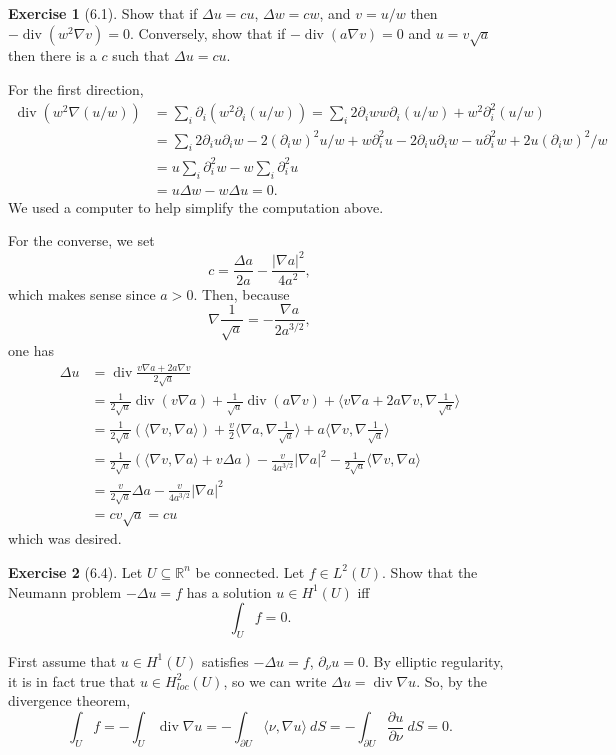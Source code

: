 \documentclass[10pt]{article}
\newcommand{\RR}{\mathbb{R}}
\DeclareMathOperator{\Div}{div}
\theoremstyle{definition}
\newtheorem{exer}{Exercise}
\begin{document}
\begin{exer}[6.1]
Show that if $\Delta u = cu$, $\Delta w = cw$, and $v = u/w$ then $-\Div(w^2\nabla v) = 0$. Conversely, show that if $-\Div(a\nabla v) = 0$ and $u = v\sqrt a$ then there is a $c$ such that $\Delta u = cu$.
\end{exer}

For the first direction,
\begin{align*}
\Div(w^2 \nabla(u/w)) &= \sum_i \partial_i(w^2 \partial_i(u/w)) = \sum_i 2\partial_iw w\partial_i(u/w) + w^2 \partial_i^2(u/w)\\
&= \sum_i 2\partial_i u\partial_i w - 2(\partial_iw)^2u/w + w\partial_i^2u - 2\partial_iu\partial_iw - u\partial_i^2w + 2u(\partial_iw)^2/w\\
&= u\sum_i \partial_i^2w - w\sum_i \partial_i^2u\\
&= u\Delta w - w\Delta u = 0.\end{align*}
We used a computer to help simplify the computation above.

For the converse, we set
$$c = \frac{\Delta a}{2a} - \frac{|\nabla a|^2}{4a^2},$$
which makes sense since $a > 0$. Then, because
$$\nabla \frac{1}{\sqrt a} = -\frac{\nabla a}{2a^{3/2}},$$
one has
\begin{align*}
\Delta u &= \Div \frac{v\nabla a + 2a\nabla v}{2\sqrt a}\\
&= \frac{1}{2\sqrt a} \Div(v \nabla a) + \frac{1}{\sqrt a} \Div(a \nabla v)  + \langle v \nabla a + 2a\nabla v, \nabla\frac{1}{\sqrt a} \rangle\\
&= \frac{1}{2\sqrt a}(\langle \nabla v, \nabla a\rangle) + \frac{v}{2}\langle \nabla a, \nabla \frac{1}{\sqrt a} \rangle + a\langle \nabla v, \nabla \frac{1}{\sqrt a} \rangle\\
&= \frac{1}{2\sqrt a}(\langle \nabla v, \nabla a\rangle + v\Delta a) - \frac{v}{4a^{3/2}}|\nabla a|^2 - \frac{1}{2\sqrt a} \langle \nabla v, \nabla a\rangle\\
&= \frac{v}{2\sqrt a}\Delta a - \frac{v}{4a^{3/2}}|\nabla a|^2 \\
&= cv\sqrt a = cu
\end{align*}
which was desired.

\begin{exer}[6.4]
Let $U \subseteq \RR^n$ be connected.
Let $f \in L^2(U)$. Show that the Neumann problem $-\Delta u = f$ has a solution $u \in H^1(U)$ iff
$$\int_U f = 0.$$
\end{exer}

First assume that $u \in H^1(U)$ satisfies $-\Delta u = f$, $\partial_\nu u = 0$.
By elliptic regularity, it is in fact true that $u \in H^2_{loc}(U)$, so we can write $\Delta u = \Div \nabla u$.
So, by the divergence theorem,
$$\int_U f = -\int_U \Div \nabla u = -\int_{\partial U} \langle \nu, \nabla u\rangle ~dS = -\int_{\partial U} \frac{\partial u}{\partial \nu}~dS = 0.$$
\end{document}
